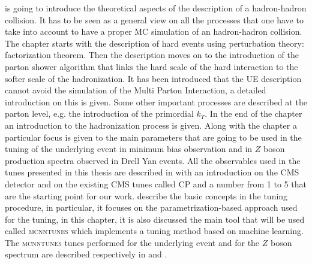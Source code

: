 \medskip

 is going to introduce the theoretical aspects of the description of a hadron-hadron collision. It has to be seen as a general view on all the processes that one have to take into account to have a proper MC simulation of an hadron-hadron collision. The chapter starts with the description of hard events using perturbation theory: factorization theorem. Then the description moves on to the introduction of the parton shower algorithm that links the hard scale of the hard interaction to the softer scale of the hadronization. It has been introduced that the UE description cannot avoid the simulation of the Multi Parton Interaction, a detailed introduction on this is given. Some other important processes are described at the parton level, e.g. the introduction of the primordial $k_T$. In the end of the chapter an introduction to the hadronization process is given. 
Along with the chapter a particular focus is given to the main parameters that are going to be used in the tuning of the underlying event in minimum bias observation and in $Z$ boson production spectra observed in Drell Yan events. All the observables used in the tunes presented in this thesis are described in  with an introduction on the CMS detector and on the existing CMS tunes called CP and a number from 1 to 5 \cite{CPtunes} that are the starting point for our work.  describe the basic concepts in the tuning procedure, in particular, it focuses on the parametrization-based approach used for the tuning, in this chapter, it is also discussed the main tool that will be used called \textsc{mcnntunes} \cite{MCNNTUNESarticle} which implements a tuning method based on machine learning. The \textsc{mcnntunes} tunes performed for the underlying event and for the $Z$ boson spectrum are described respectively in  and .
 
